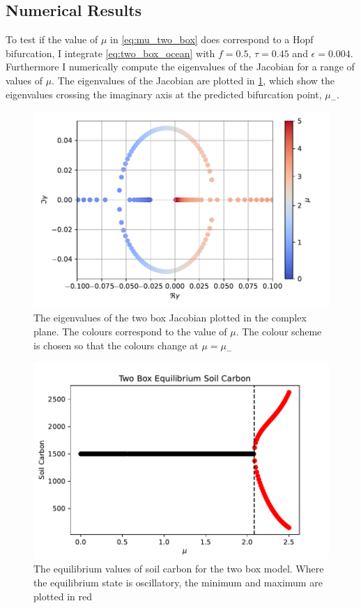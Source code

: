 \subsection{Numerical Results}
To test if the value of $\mu$ in \cref{eq:mu_two_box} does correspond to a Hopf bifurcation, I integrate \cref{eq:two_box_ocean} with $f = 0.5$, $\tau = 0.45$ and $\epsilon = 0.004$.
Furthermore I numerically compute the eigenvalues of the Jacobian for a range of values of $\mu$. The eigenvalues of the Jacobian are plotted in \cref{fig:eigen_values_of_the_jacobian},
which show the eigenvalues crossing the imaginary axis at the predicted bifurcation point, $\mu_-$.
\begin{figure}
  \centering
  \includegraphics[width=\textwidth,keepaspectratio]{complex_plane_two_box_eig}
  \caption{The eigenvalues of the two box Jacobian plotted in the complex plane. The colours correspond to the value of $\mu$. The colour scheme is chosen so that the colours change at $\mu = \mu_-$ }
  \label{fig:eigen_values_of_the_jacobian}
\end{figure}
\begin{figure}
  \centering
  \includegraphics[keepaspectratio,width=\textwidth]{two_box_model_soil_carbon_equilibrium}
  \caption{The equilibrium values of soil carbon for the two box model. Where the equilibrium state is oscillatory, the minimum and maximum are plotted in red}
  \label{fig:two_box_bf_diagram}
\end{figure}
